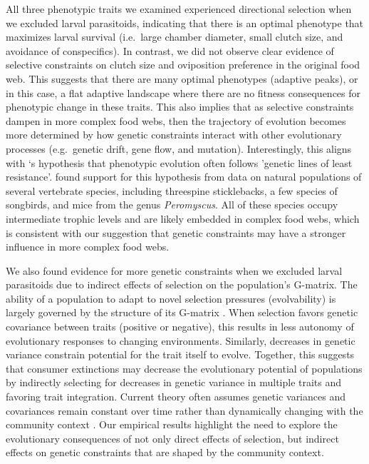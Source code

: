 \documentclass[11pt,]{article}
\begin{document}
All three phenotypic traits we examined experienced directional
selection when we excluded larval parasitoids, indicating that there is
an optimal phenotype that maximizes larval survival (i.e.~large chamber
diameter, small clutch size, and avoidance of conspecifics). In
contrast, we did not observe clear evidence of selective constraints on
clutch size and oviposition preference in the original food web. This
suggests that there are many optimal phenotypes (adaptive peaks), or in
this case, a flat adaptive landscape where there are no fitness
consequences for phenotypic change in these traits. This also implies
that as selective constraints dampen in more complex food webs, then the
trajectory of evolution becomes more determined by how genetic
constraints interact with other evolutionary processes (e.g.~genetic
drift, gene flow, and mutation). Interestingly, this aligns with
\citet{Schluter1996}`s hypothesis that phenotypic evolution often
follows 'genetic lines of least resistance'. \citet{Schluter1996} found
support for this hypothesis from data on natural populations of several
vertebrate species, including threespine sticklebacks, a few species of
songbirds, and mice from the genus \emph{Peromyscus}. All of these
species occupy intermediate trophic levels and are likely embedded in
complex food webs, which is consistent with our suggestion that genetic
constraints may have a stronger influence in more complex food webs.

We also found evidence for more genetic constraints when we excluded
larval parasitoids due to indirect effects of selection on the
population's G-matrix. The ability of a population to adapt to novel
selection pressures (evolvability) is largely governed by the structure
of its G-matrix \citep{Hansen2008}. When selection favors genetic
covariance between traits (positive or negative), this results in less
autonomy of evolutionary responses to changing environments. Similarly,
decreases in genetic variance constrain potential for the trait itself
to evolve. Together, this suggests that consumer extinctions may
decrease the evolutionary potential of populations by indirectly
selecting for decreases in genetic variance in multiple traits and
favoring trait integration. Current theory often assumes genetic
variances and covariances remain constant over time rather than
dynamically changing with the community context
\citep{McPeek2017, Guimaraes2017}. Our empirical results highlight the
need to explore the evolutionary consequences of not only direct effects
of selection, but indirect effects on genetic constraints that are
shaped by the community context.
\end{document}
